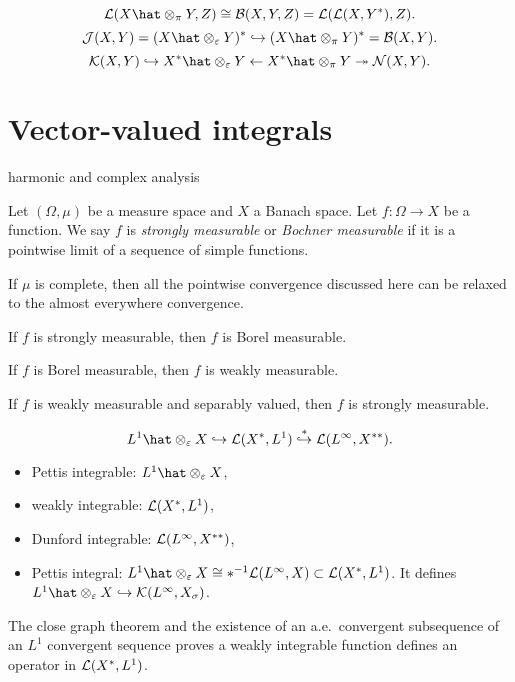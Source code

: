 \documentclass{../../large}
\begin{document}
\begin{prb}
\[\cL(X\hat\otimes_\pi Y,Z)\cong\cB(X,Y,Z)=\cL(\cL(X,Y^*),Z).\]
\[\cJ(X,Y)=(X\hat\otimes_\e Y)^*\hookrightarrow(X\hat\otimes_\pi Y)^*=\cB(X,Y).\]
\[\cK(X,Y)\hookrightarrow X^*\hat\otimes_\e Y\leftarrow X^*\hat\otimes_\pi Y\twoheadrightarrow\cN(X,Y).\]
	
\end{prb}

\section{Vector-valued integrals}


harmonic and complex analysis


\begin{prb}
Let $(\Omega,\mu)$ be a measure space and $X$ a Banach space.
Let $f:\Omega\to X$ be a function.
We say $f$ is \emph{strongly measurable} or \emph{Bochner measurable} if it is a pointwise limit of a sequence of simple functions.

If $\mu$ is complete, then all the pointwise convergence discussed here can be relaxed to the almost everywhere convergence.
\begin{parts}
\item If $f$ is strongly measurable, then $f$ is Borel measurable.
\item If $f$ is Borel measurable, then $f$ is weakly measurable.
\item If $f$ is weakly measurable and separably valued, then $f$ is strongly measurable.
\end{parts}
\end{prb}

\begin{prb}
\[L^1\hat\otimes_\e X\hookrightarrow\cL(X^*,L^1)\stackrel{*}{\hookrightarrow}\cL(L^\infty,X^{**}).\]
\begin{itemize}
\item Pettis integrable: $L^1\hat\otimes_\e X$,
\item weakly integrable: $\mathcal{L}(X^*,L^1)$,
\item Dunford integrable: $\mathcal{L}(L^\infty,X^{**})$,
\item Pettis integral: $L^1\hat\otimes_\e X\cong *^{-1}\cL(L^\infty,X)\subset\cL(X^*,L^1)$. It defines $L^1\hat\otimes_\e X\hookrightarrow\cK(L^\infty,X_\sigma)$.
\end{itemize}

\begin{parts}
\item The close graph theorem and the existence of an a.e.~convergent subsequence of an $L^1$ convergent sequence proves a weakly integrable function defines an operator in $\mathcal{L}(X^*,L^1)$.
\end{parts}
\end{prb}
\end{document}
